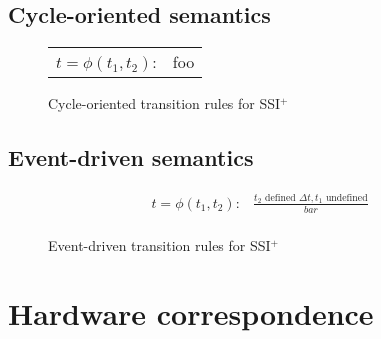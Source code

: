 \documentclass[12pt,notitlepage,twoside]{article}
\newcommand{\ssiplus}{SSI$^+$}
\begin{document}
\subsection{Cycle-oriented semantics}

\begin{figure}[t]
\begin{center}\begin{tabular}{lc}
$t =\phi(t_1, t_2)$: & foo\\
\end{tabular}\end{center}
\caption{Cycle-oriented transition rules for \ssiplus}
\label{fig:cyclesemantics}
\end{figure}

\subsection{Event-driven semantics}

\begin{figure}[t]
\begin{center}\begin{displaymath}\begin{array}{lc}
t =\phi(t_1, t_2): &
\frac{t_2\mbox{ defined }\Delta t,t_1\mbox{ undefined}}{bar}\\
\end{array}\end{displaymath}\end{center}
\caption{Event-driven transition rules for \ssiplus}
\label{fig:eventsemantics}
\end{figure}

\section{Hardware correspondence}


\appendix
\end{document}
